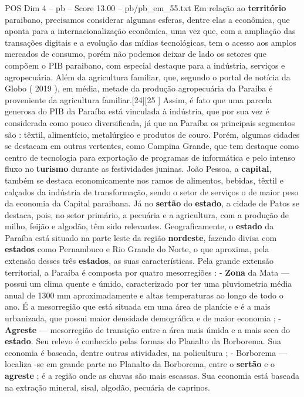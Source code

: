 \begin{textsample}{POS Dim 4 – pb – Score 13.00 – pb/pb\_em\_55.txt}
Em relação ao \textbf{território} paraibano, precisamos considerar algumas esferas, dentre elas a econômica, que aponta para a internacionalização econômica, uma vez que, com a ampliação das transações digitais e a evolução das mídias tecnológicas, tem o acesso aos amplos mercados de consumo, porém não podemos deixar de lado os setores que compõem o PIB paraibano, com especial destaque para a indústria, serviços e agropecuária.
Além da agricultura familiar, que, segundo o portal de notícia da Globo ( 2019 ), em média, metade da produção agropecuária da Paraíba é proveniente da agricultura familiar.[24][25 ] Assim, é fato que uma parcela generosa do PIB da Paraíba está vinculada à indústria, que por sua vez é considerada como pouco diversificada, já que na Paraíba os principais segmentos são : têxtil, alimentício, metalúrgico e produtos de couro.
Porém, algumas cidades se destacam em outras vertentes, como Campina Grande, que tem destaque como centro de tecnologia para exportação de programas de informática e pelo intenso fluxo no \textbf{turismo} durante as festividades juninas.
João Pessoa, a \textbf{capital}, também se destaca economicamente nos ramos de alimentos, bebidas, têxtil e calçados da indústria de transformação, sendo o setor de serviços o de maior peso da economia da Capital paraibana.
Já no \textbf{sertão} do \textbf{estado}, a cidade de Patos se destaca, pois, no setor primário, a pecuária e a agricultura, com a produção de milho, feijão e algodão, têm sido relevantes.
Geograficamente, o \textbf{estado} da Paraíba está situado na parte leste da região \textbf{nordeste}, fazendo divisa com \textbf{estados} como Pernambuco e Rio Grande do Norte, o que aproxima, pela extensão desses três \textbf{estados}, as suas características.
Pela grande extensão territorial, a Paraíba é composta por quatro mesorregiões : - \textbf{Zona} da Mata — possui um clima quente e úmido, caracterizado por ter uma pluviometria média anual de 1300 mm aproximadamente e altas temperaturas ao longo de todo o ano.
É a mesorregião que está situada em uma área de planície e é a mais urbanizada, que possui maior densidade demográfica e de maior economia ; - \textbf{Agreste} — mesorregião de transição entre a área mais úmida e a mais seca do \textbf{estado}.
Seu relevo é conhecido pelas formas do Planalto da Borborema.
Sua economia é baseada, dentre outras atividades, na policultura ; - Borborema — localiza -se em grande parte no Planalto da Borborema, entre o \textbf{sertão} e o \textbf{agreste} ; é a região onde as chuvas são mais escassas.
Sua economia está baseada na extração mineral, sisal, algodão, pecuária de caprinos.

\end{textsample}

